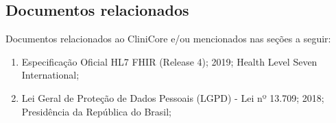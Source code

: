 \subsection{Documentos relacionados}
Documentos relacionados ao CliniCore e/ou mencionados nas seções a seguir:
\begin{enumerate}[label=\arabic*.]
    \item Especificação Oficial HL7 FHIR (Release 4); 2019; Health Level Seven International;
    \item Lei Geral de Proteção de Dados Pessoais (LGPD) - Lei nº 13.709; 2018; Presidência da República do Brasil;
\end{enumerate}